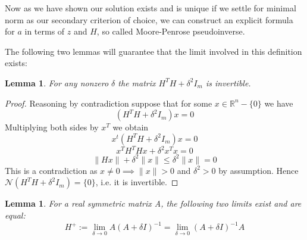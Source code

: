 \documentclass[a4paper]{article}
\theoremstyle{break}
\newtheorem{lemma}[theorem]{Lemma}
\newcommand{\R}{\mathbb{R}}
\newcommand{\Nu}{\mathcal{N}}
\begin{document}
Now as we have shown our solution exists and is unique if we settle for minimal norm as our secondary criterion of choice, we can construct an explicit formula for $a$ in terms of $z$ and $H$, so called Moore-Penrose pseudoinverse.


The following two lemmas will guarantee that the limit involved in this definition exists:

\begin{lemma}\label{lem:invertible_1}
    For any nonzero $\delta$ the matrix $H^T H + \delta^2  I_m$ is invertible.
    \label{thm:invertible}
\end{lemma}
\begin{proof}
    Reasoning by contradiction suppose that for some $x \in \R^n - \{0\}$ we have
    $$ (H^T H + \delta^2  I_m) x = 0 $$ %
Multiplying both sides by $x^T$ we obtain
    $$ x^t (H^T H + \delta^2  I_m) x = 0 $$ %
    $$ x^T H^T H x + \delta^2 x^T x = 0 $$
    $$ \| H x \| + \delta^2 \| x \| \leq \delta^2 \| x \| = 0 $$
This is a contradiction as $ x \neq 0 \implies \| x \| > 0 $ and $ \delta^2 > 0$ by assumption.
Hence $\Nu(H^T H + \delta^2  I_m) = \{0\} $, i.e. it is invertible.
\end{proof}

\begin{lemma}\label{lem:limit_existence_1}
    For a real symmetric matrix A, the following two limits exist and are equal:
    \begin{equation}
        H^+ := \lim_{\delta \to 0} A ( A + \delta I) ^{-1}
            = \lim_{\delta \to 0} ( A + \delta I) ^{-1} A
    \end{equation}
\end{lemma}
\end{document}
